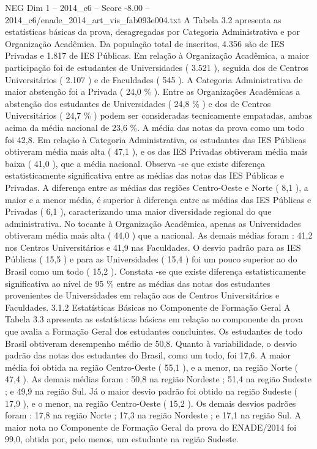 \begin{textsample}{NEG Dim 1 – 2014\_c6 – Score -8.00 – 2014\_c6/enade\_2014\_art\_vis\_fab093e004.txt}
A Tabela 3.2 apresenta as estatísticas básicas da prova, desagregadas por Categoria Administrativa e por Organização Acadêmica.
Da população total de inscritos, 4.356 são de IES Privadas e 1.817 de IES Públicas.
Em relação à Organização Acadêmica, a maior participação foi de estudantes de Universidades ( 3.521 ), seguida dos de Centros Universitários ( 2.107 ) e de Faculdades ( 545 ).
A Categoria Administrativa de maior abstenção foi a Privada ( 24,0 \% ).
Entre as Organizações Acadêmicas a abstenção dos estudantes de Universidades ( 24,8 \% ) e dos de Centros Universitários ( 24,7 \% ) podem ser consideradas tecnicamente empatadas, ambas acima da média nacional de 23,6 \%.
A média das notas da prova como um todo foi 42,8.
Em relação à Categoria Administrativa, os estudantes das IES Públicas obtiveram média mais alta ( 47,1 ), e os das IES Privadas obtiveram média mais baixa ( 41,0 ), que a média nacional.
Observa -se que existe diferença estatisticamente significativa entre as médias das notas das IES Públicas e Privadas.
A diferença entre as médias das regiões Centro-Oeste e Norte ( 8,1 ), a maior e a menor média, é superior à diferença entre as médias das IES Públicas e Privadas ( 6,1 ), caracterizando uma maior diversidade regional do que administrativa.
No tocante à Organização Acadêmica, apenas as Universidades obtiveram média mais alta ( 44,0 ) que a nacional.
As demais médias foram : 41,2 nos Centros Universitários e 41,9 nas Faculdades.
O desvio padrão para as IES Públicas ( 15,5 ) e para as Universidades ( 15,4 ) foi um pouco superior ao do Brasil como um todo ( 15,2 ).
Constata -se que existe diferença estatisticamente significativa ao nível de 95 \% entre as médias das notas dos estudantes provenientes de Universidades em relação aos de Centros Universitários e Faculdades. 3.1.2 Estatísticas Básicas no Componente de Formação Geral A Tabela 3.3 apresenta as estatísticas básicas em relação ao componente da prova que avalia a Formação Geral dos estudantes concluintes.
Os estudantes de todo Brasil obtiveram desempenho médio de 50,8.
Quanto à variabilidade, o desvio padrão das notas dos estudantes do Brasil, como um todo, foi 17,6.
A maior média foi obtida na região Centro-Oeste ( 55,1 ), e a menor, na região Norte ( 47,4 ).
As demais médias foram : 50,8 na região Nordeste ; 51,4 na região Sudeste ; e 49,9 na região Sul.
Já o maior desvio padrão foi obtido na região Sudeste ( 17,9 ), e o menor, na região Centro-Oeste ( 15,2 ).
Os demais desvios padrões foram : 17,8 na região Norte ; 17,3 na região Nordeste ; e 17,1 na região Sul.
A maior nota no Componente de Formação Geral da prova do ENADE/2014 foi 99,0, obtida por, pelo menos, um estudante na região Sudeste.

\end{textsample}
